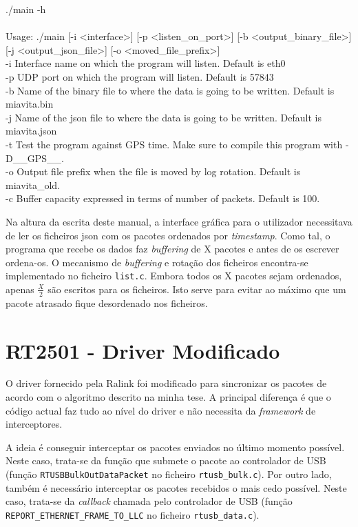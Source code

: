 \documentclass[10pt,a4paper,oneside]{book}
\begin{document}
    \begin{flushleft}
      ./main -h\\\hfill\\
      Usage: ./main [-i <interface>] [-p <listen\_on\_port>] [-b <output\_binary\_file>] [-j <output\_json\_file>] [-o <moved\_file\_prefix>]\\
      -i Interface name on which the program will listen. Default is eth0\\
      -p UDP port on which the program will listen. Default is 57843\\
      -b Name of the binary file to where the data is going to be written. Default is miavita.bin\\
      -j Name of the json file to where the data is going to be written. Default is miavita.json\\
      -t Test the program against GPS time. Make sure to compile this program with -D\_\_GPS\_\_.\\
      -o Output file prefix when the file is moved by log rotation. Default is miavita\_old.\\
      -c Buffer capacity expressed in terms of number of packets. Default is 100.
    \end{flushleft}

    Na altura da escrita deste manual, a interface gráfica para o utilizador necessitava de ler os ficheiros json com os pacotes ordenados por \emph{timestamp}. Como tal, o programa que recebe os dados faz \emph{buffering} de X pacotes e antes de os escrever ordena-os. O mecanismo de \emph{buffering} e rotação dos ficheiros encontra-se implementado no ficheiro {\tt list.c}. Embora todos os X pacotes sejam ordenados, apenas $\frac{X}{2}$ são escritos para os ficheiros. Isto serve para evitar ao máximo que um pacote atrasado fique desordenado nos ficheiros.
    
\section{RT2501 - Driver Modificado}\label{sec:driver}

O driver fornecido pela Ralink foi modificado para sincronizar os pacotes de acordo com o algoritmo descrito na minha tese. A principal diferença é que o código actual faz tudo ao nível do driver e não necessita da \emph{framework} de interceptores.

A ideia é conseguir interceptar os pacotes enviados no último momento possível. Neste caso, trata-se da função que submete o pacote ao controlador de USB (função {\tt RTUSBBulkOutDataPacket} no ficheiro {\tt rtusb\_bulk.c}). Por outro lado, também é necessário interceptar os pacotes recebidos o mais cedo possível. Neste caso, trata-se da \emph{callback} chamada pelo controlador de USB (função {\tt REPORT\_ETHERNET\_FRAME\_TO\_LLC} no ficheiro {\tt rtusb\_data.c}).
\end{document}
